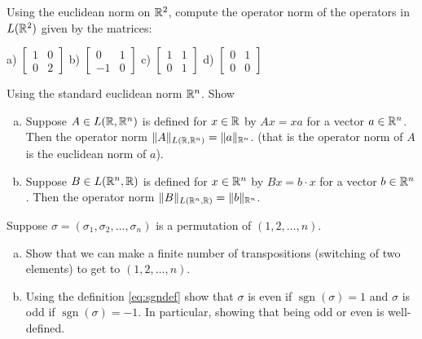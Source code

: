 \begin{exercise}
Using the euclidean norm on ${\mathbb{R}}^2$, compute the operator norm of the
operators in $L({\mathbb{R}}^2)$ given by the matrices:

\medskip
\noindent
a)
$\left[
\begin{smallmatrix}
1 & 0 \\
0 & 2
\end{smallmatrix}
\right]$
\quad
b)
$\left[
\begin{smallmatrix}
0 & 1 \\
-1 & 0
\end{smallmatrix}
\right]$
\quad
c)
$\left[
\begin{smallmatrix}
1 & 1 \\
0 & 1
\end{smallmatrix}
\right]$
\quad
d)
$\left[
\begin{smallmatrix}
0 & 1 \\
0 & 0
\end{smallmatrix}
\right]$
\end{exercise}


\begin{exercise} \label{exercise:normonedim}
Using the standard euclidean norm ${\mathbb{R}}^n$. Show
\begin{enumerate}[a)]
\item
Suppose $A \in L({\mathbb{R}},{\mathbb{R}}^n)$ is defined for $x \in {\mathbb{R}}$ by $Ax = xa$
for a vector $a \in {\mathbb{R}}^n$.
Then the operator norm $\lVert {A} \rVert_{L({\mathbb{R}},{\mathbb{R}}^n)} = \lVert {a} \rVert_{{\mathbb{R}}^n}$.
(that is the operator norm of $A$ is the euclidean norm of $a$).
\item
Suppose $B \in L({\mathbb{R}}^n,{\mathbb{R}})$ is defined for $x \in {\mathbb{R}}^n$ by $Bx = b \cdot x$
for a vector $b \in {\mathbb{R}}^n$.
Then the operator norm $\lVert {B} \rVert_{L({\mathbb{R}}^n,{\mathbb{R}})} = \lVert {b} \rVert_{{\mathbb{R}}^n}$.
\end{enumerate}
\end{exercise}

\begin{exercise}
Suppose $\sigma = (\sigma_1,\sigma_2,\ldots,\sigma_n)$ is a permutation of
$(1,2,\ldots,n)$.
\begin{enumerate}[a)]
\item
Show that we can make a finite number of transpositions (switching of two
elements) to get to $(1,2,\ldots,n)$.
\item
Using the definition \eqref{eq:sgndef}
show that $\sigma$ is even if $\operatorname{sgn}(\sigma) = 1$ and $\sigma$
is odd if $\operatorname{sgn}(\sigma) = -1$.  In particular, showing that
being odd or even is well-defined.
\end{enumerate}
\end{exercise}

